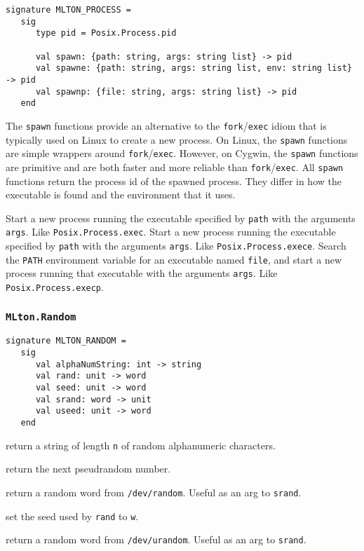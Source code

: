 \begin{verbatim}
signature MLTON_PROCESS =
   sig
      type pid = Posix.Process.pid

      val spawn: {path: string, args: string list} -> pid
      val spawne: {path: string, args: string list, env: string list} -> pid
      val spawnp: {file: string, args: string list} -> pid
   end
\end{verbatim}

The {\tt spawn} functions provide an alternative to the {\tt fork}/{\tt exec}
idiom that is typically used on Linux to create a new process.  On Linux, the
{\tt spawn} functions are simple wrappers around {\tt fork}/{\tt exec}.
However, on Cygwin, the {\tt spawn} functions are primitive and are both faster
and more reliable than {\tt fork}/{\tt exec}.  All {\tt spawn} functions return
the process id of the spawned process.  They differ in how the executable is
found and the environment that it uses.

\begin{description}
Start a new process running the executable specified by {\tt path} with the
arguments {\tt args}.  Like {\tt Posix.Process.exec}.
Start a new process running the executable specified by {\tt path} with the
arguments {\tt args}.  Like {\tt Posix.Process.exece}.
Search the {\tt PATH} environment variable for an executable named {\tt file},
and start a new process running that executable with the arguments {\tt args}.
Like {\tt Posix.Process.execp}.
\end{description}

\subsubsection{\tt MLton.Random}
\begin{verbatim}
signature MLTON_RANDOM =
   sig
      val alphaNumString: int -> string
      val rand: unit -> word
      val seed: unit -> word
      val srand: word -> unit
      val useed: unit -> word
   end
\end{verbatim}

\begin{description}
return a string of length {\tt n} of random alphanumeric characters.

return the next pseudrandom number.

return a random word from {\tt /dev/random}.  Useful as an arg to {\tt srand}.

set the seed used by {\tt rand} to {\tt w}.

return a random word from {\tt /dev/urandom}.  Useful as an arg to {\tt srand}.
\end{description}

